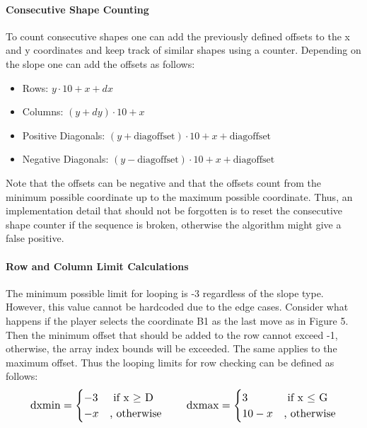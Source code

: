 \documentclass[conference]{IEEEtran}
\begin{document}
\paragraph{Consecutive Shape Counting}
To count consecutive shapes one can add the previously defined offsets to the x and y coordinates and keep track of similar shapes using a counter. Depending on the slope one can add the offsets as follows:
\begin{itemize}
\item Rows: \(y \cdot 10 + x + dx \)
\item Columns: \((y + dy) \cdot 10 + x\) 
\item Positive Diagonals: \((y + \text{diagoffset}) \cdot 10 + x + \text{diagoffset}\)
\item Negative Diagonals: \((y - \text{diagoffset}) \cdot 10 + x + \text{diagoffset}\)
\end{itemize} \hfill \hfill
\par Note that the offsets can be negative and that the offsets count from the minimum possible coordinate up to the maximum possible coordinate. Thus, an implementation detail that should not be forgotten is to reset the consecutive shape counter if the sequence is broken, otherwise the algorithm might give a false positive. \\
\paragraph{Row and Column Limit Calculations} The minimum possible limit for looping is -3 regardless of the slope type. However, this value cannot be hardcoded due to the edge cases. Consider what happens if the player selects the coordinate B1 as the last move as in Figure 5. Then the minimum offset that should be added to the row cannot exceed -1, otherwise, the array index bounds will be exceeded. The same applies to the maximum offset. Thus the looping limits for row checking can be defined as follows: \begin{gather*}\resizebox{0.9\hsize}{!}{$
\text{dxmin} =
\begin{cases}
 -3 &\text{ if x \(\geq\) D} \\ -x &\text{, otherwise} 
\end{cases} \qquad 
\text{dxmax} =
\begin{cases}
 3 &\text{ if x \(\leq\) G} \\ 10-x &\text{, otherwise} 
\end{cases}$}
\end{gather*} \\
\end{document}
